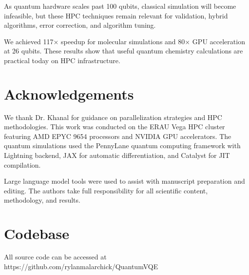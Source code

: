 \documentclass[11pt]{article}
\begin{document}
As quantum hardware scales past 100 qubits, classical simulation will become infeasible, but these HPC techniques remain relevant for validation, hybrid algorithms, error correction, and algorithm tuning.

We achieved 117× speedup for molecular simulations and 80× GPU acceleration at 26 qubits. These results show that useful quantum chemistry calculations are practical today on HPC infrastructure.

\section{Acknowledgements}

We thank Dr. Khanal for guidance on parallelization strategies and HPC methodologies. This work was conducted on the ERAU Vega HPC cluster featuring AMD EPYC 9654 processors and NVIDIA GPU accelerators. The quantum simulations used the PennyLane quantum computing framework with Lightning backend, JAX for automatic differentiation, and Catalyst for JIT compilation.

Large language model tools were used to assist with manuscript preparation and editing. The authors take full responsibility for all scientific content, methodology, and results.

\section{Codebase}

All source code can be accessed at https://github.com/rylanmalarchick/QuantumVQE
\end{document}
